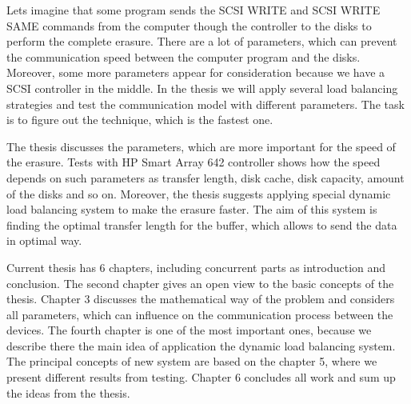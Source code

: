 Lets imagine that some program sends the SCSI WRITE and SCSI WRITE SAME commands from the computer though the controller to the disks to perform the complete erasure. There are a lot of parameters, which can prevent the communication speed between the computer program and the disks. Moreover, some more parameters appear for consideration because we have a SCSI controller in the middle. In the thesis we will apply several load balancing strategies and test the communication model with different parameters. The task is to figure out the technique, which is the fastest one.

The thesis discusses the parameters, which are more important for the speed of the erasure. Tests with HP Smart Array 642 controller shows how the speed depends on such parameters as transfer length, disk cache, disk capacity, amount of the disks and so on. Moreover, the thesis suggests applying special dynamic load balancing system to make the erasure faster. The aim of this system is finding the optimal transfer length for the buffer, which allows to send the data in optimal way. 

Current thesis has 6 chapters, including concurrent parts as introduction and conclusion. The second chapter gives an open view to the basic concepts of the thesis. Chapter 3 discusses the mathematical way of the problem and considers all parameters, which can influence on the communication process between the devices. The fourth chapter is one of the most important ones, because we describe there the main idea of application the dynamic load balancing system. The principal concepts of new system are based on the chapter 5, where we present different results from testing. Chapter 6 concludes all work and sum up the ideas from the thesis.

